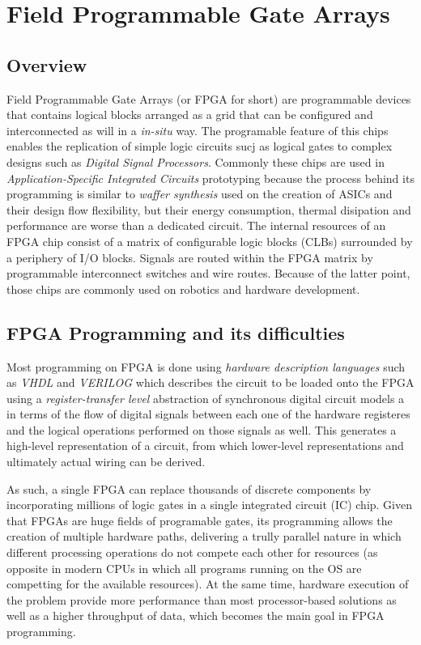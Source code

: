 \section{Field Programmable Gate Arrays}
\subsection{Overview}
Field Programmable Gate Arrays (or FPGA for short) are programmable devices that contains logical blocks arranged as a grid that can be configured and
interconnected as will in a \emph{in-situ} way. The programable feature of this chips enables the replication of simple logic circuits sucj as logical
gates to complex designs such as \emph{Digital Signal Processors}. Commonly these chips are used in \emph{Application-Specific Integrated Circuits}
prototyping because the process behind its programming is similar to \emph{waffer synthesis} used on the creation of ASICs and their design flow
flexibility, but their energy consumption, thermal disipation and performance are worse than a dedicated circuit. The internal resources of an FPGA 
chip consist of a matrix of configurable logic blocks (CLBs) surrounded by a periphery of I/O blocks. Signals are routed within the FPGA matrix by 
programmable interconnect switches and wire routes. Because of the latter point, those chips are commonly used on robotics and hardware development.

\subsection{FPGA Programming and its difficulties}
Most programming on FPGA is done using \emph{hardware description languages} such as \emph{VHDL} and \emph{VERILOG} which describes the circuit to be
loaded onto the FPGA using a \emph{register-transfer level} abstraction of synchronous digital circuit models a in terms of the flow of digital signals 
between each one of the hardware registeres and the logical operations performed on those signals as well. This generates a high-level representation
of a circuit, from which lower-level representations and ultimately actual wiring can be derived. 

As such, a single FPGA can replace thousands of discrete components by incorporating millions of logic gates in a single integrated circuit (IC) chip. 
Given that FPGAs are huge fields of programable gates, its programming allows the creation of multiple hardware paths, delivering a trully parallel nature
in which different processing operations do not compete each other for resources (as opposite in modern CPUs in which all programs running on the OS are
competting for the available resources). At the same time, hardware execution of the problem provide more performance than most processor-based solutions
as well as a higher throughput of data, which becomes the main goal in FPGA programming.

